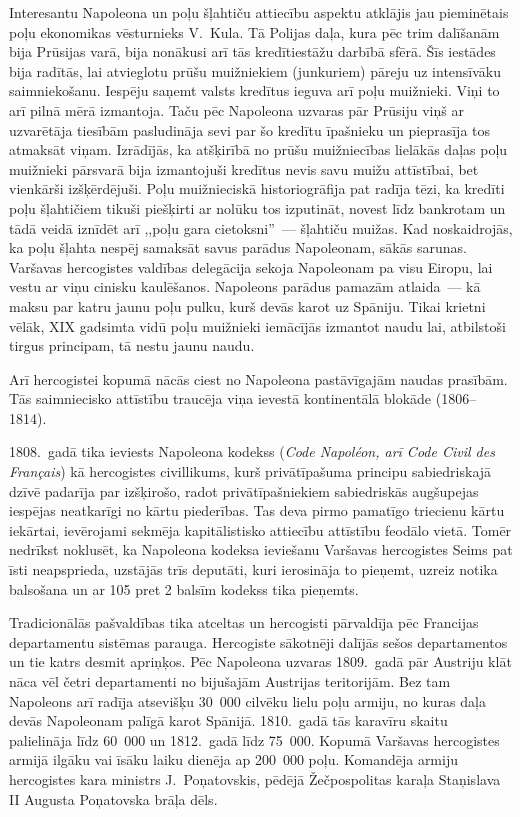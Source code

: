 \documentclass[twoside,a5paper,12pt,fleqn,openany]{extbook}
\newcommand{\frtxti}[1]{\textit{\textfrench{#1}}}
\begin{document}
Interesantu Napoleona un poļu šļahtiču attiecību aspektu atklājis jau pieminētais poļu ekonomikas vēsturnieks V.~Kula. Tā Polijas daļa, kura pēc trim dalīšanām bija Prūsijas varā, bija nonākusi arī tās kredītiestāžu darbībā sfērā. Šīs iestādes bija radītās, lai atvieglotu prūšu muižniekiem (junkuriem) pāreju uz intensīvāku saimniekošanu. Iespēju saņemt valsts kredītus ieguva arī poļu muižnieki. Viņi to arī pilnā mērā izmantoja. Taču pēc Napoleona uzvaras pār Prūsiju viņš ar uzvarētāja tiesībām pasludināja sevi par šo kredītu īpašnieku un pieprasīja tos atmaksāt viņam. Izrādījās, ka atšķirībā no prūšu muižniecības lielākās daļas poļu muižnieki pārsvarā bija izmantojuši kredītus nevis savu muižu attīstībai, bet vienkārši izšķērdējuši. Poļu muižnieciskā historiogrāfija pat radīja tēzi, ka kredīti poļu šļahtičiem tikuši piešķirti ar nolūku tos izputināt, novest līdz bankrotam un tādā veidā iznīdēt arī ,,poļu gara cietoksni''~--- šļahtiču muižas. Kad noskaidrojās, ka poļu šļahta nespēj samaksāt savus parādus Napoleonam, sākās sarunas. Varšavas hercogistes valdības delegācija sekoja Napoleonam pa visu Eiropu, lai vestu ar viņu cinisku kaulēšanos. Napoleons parādus pamazām atlaida~--- kā maksu par katru jaunu poļu pulku, kurš devās karot uz Spāniju. Tikai krietni vēlāk, XIX gadsimta vidū poļu muižnieki iemācījās izmantot naudu lai, atbilstoši tirgus principam, tā nestu jaunu naudu.

Arī hercogistei kopumā nācās ciest no Napoleona pastāvīgajām naudas prasībām. Tās saimniecisko attīstību traucēja viņa ievestā kontinentālā blokāde (1806--1814).

1808.~gadā tika ieviests Napoleona kodekss (\frtxti{Code Napoléon, arī Code Civil des Français}) kā hercogistes civillikums, kurš privātīpašuma principu sabiedriskajā dzīvē padarīja par izšķirošo, radot privātīpašniekiem sabiedriskās augšupejas iespējas neatkarīgi no kārtu piederības. Tas deva pirmo pamatīgo triecienu kārtu iekārtai, ievērojami sekmēja kapitālistisko attiecību attīstību feodālo vietā. Tomēr nedrīkst noklusēt, ka Napoleona kodeksa ieviešanu Varšavas hercogistes Seims pat īsti neapsprieda, uzstājās trīs deputāti, kuri ierosināja to pieņemt, uzreiz notika balsošana un ar 105 pret 2 balsīm kodekss tika pieņemts.

Tradicionālās pašvaldības tika atceltas un hercogisti pārvaldīja pēc Francijas departamentu sistēmas parauga. Hercogiste sākotnēji dalījās sešos departamentos un tie katrs desmit apriņķos. Pēc Napoleona uzvaras 1809.~gadā pār Austriju klāt nāca vēl četri departamenti no bijušajām Austrijas teritorijām. Bez tam Napoleons arī radīja atsevišķu 30~000 cilvēku lielu poļu armiju, no kuras daļa devās Napoleonam palīgā karot Spānijā. 1810.~gadā tās karavīru skaitu palielināja līdz 60~000 un 1812.~gadā līdz 75~000. Kopumā Varšavas hercogistes armijā ilgāku vai īsāku laiku dienēja ap 200~000 poļu. Komandēja armiju hercogistes kara ministrs J.~Poņatovskis, pēdējā Žečpospolitas karaļa Staņislava II Augusta Poņatovska brāļa dēls.
\end{document}
